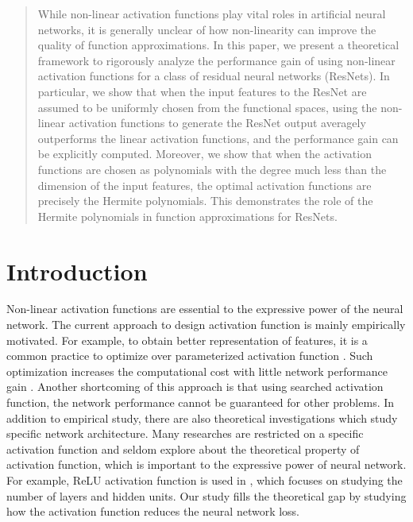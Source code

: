 \documentclass[conference]{IEEEtran}
\begin{document}
\begin{abstract}
While non-linear activation functions play vital roles in artificial neural networks, it is generally unclear of how non-linearity can improve the quality of function approximations.
In this paper, we present a theoretical framework to rigorously analyze the performance gain of using non-linear activation functions for a class of residual neural networks (ResNets). In particular, we show that when the input features to the ResNet are assumed to be uniformly chosen from the functional spaces, using the non-linear activation functions to generate the ResNet output averagely outperforms the linear activation functions, and the performance gain can be explicitly computed. Moreover, we show that when the activation functions are chosen as polynomials with the degree much less than the dimension of the input features, the optimal activation functions are precisely the Hermite polynomials. This demonstrates the role of the Hermite polynomials in function approximations for ResNets.
\end{abstract}



\section{Introduction}
Non-linear activation functions
are essential to the expressive power of the neural network.
The current approach to design
activation function is mainly empirically motivated.
For example, to obtain better representation of features,
it is a common practice to optimize over parameterized activation function \cite{ramachandran2017searching}.
Such optimization increases the computational cost with little network performance gain \cite{laudani2015training}.
Another shortcoming of this approach is that using searched activation function, the network performance cannot be guaranteed for other problems.
In addition to empirical study, there are also theoretical investigations which study specific network architecture.
Many researches are restricted on a specific activation function and seldom explore about the theoretical property of activation function,
which is important to the expressive power of neural network.
For example, ReLU activation function is used in \cite{AroraBMM18}, which focuses on studying the number of layers and hidden units.
Our study fills the theoretical gap by studying how the activation function reduces the neural network loss.
\end{document}
